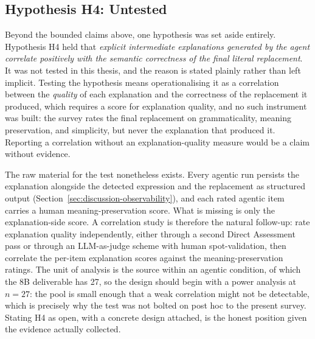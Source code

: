 \subsection{Hypothesis H4: Untested}
\label{sec:discussion-h4}


Beyond the bounded claims above, one hypothesis was set aside entirely. Hypothesis H4 held that \textit{explicit intermediate explanations generated by the agent correlate positively with the semantic correctness of the final literal replacement}. It was not tested in this thesis, and the reason is stated plainly rather than left implicit. Testing the hypothesis means operationalising it as a correlation between the \textit{quality} of each explanation and the correctness of the replacement it produced, which requires a score for explanation quality, and no such instrument was built: the survey rates the final replacement on grammaticality, meaning preservation, and simplicity, but never the explanation that produced it. Reporting a correlation without an explanation-quality measure would be a claim without evidence.

The raw material for the test nonetheless exists. Every agentic run persists the explanation alongside the detected expression and the replacement as structured output (Section~\ref{sec:discussion-observability}), and each rated agentic item carries a human meaning-preservation score. What is missing is only the explanation-side score. A correlation study is therefore the natural follow-up: rate explanation quality independently, either through a second Direct Assessment pass or through an LLM-as-judge scheme with human spot-validation, then correlate the per-item explanation scores against the meaning-preservation ratings. The unit of analysis is the source within an agentic condition, of which the 8B deliverable has 27, so the design should begin with a power analysis at $n = 27$: the pool is small enough that a weak correlation might not be detectable, which is precisely why the test was not bolted on post hoc to the present survey. Stating H4 as open, with a concrete design attached, is the honest position given the evidence actually collected.

